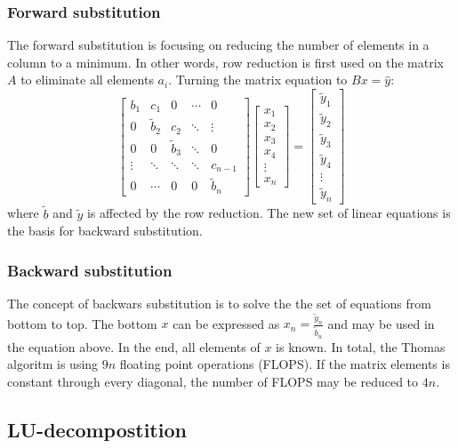 \documentclass[twoside,twocolumn]{article}
\begin{document}
\subsubsection{Forward substitution}
The forward substitution is focusing on reducing the number of elements in a column to a minimum. In other words, row reduction is first used on the matrix $A$ to eliminate all elements $a_{i}$. Turning the matrix equation to $Bx=\hat{y}$:
\begin{equation*}
\begin{bmatrix}
b_1&c_1&0&\cdots &0\\
0&\tilde{b}_2&c_2& \ddots & \vdots\\
0&0&\tilde{b}_3&\ddots&0\\
\vdots&\ddots&\ddots&\ddots&c_{n-1}\\
0&\cdots&0&0&\tilde{b}_n
\end{bmatrix}
\begin{bmatrix}
x_1\\x_2\\x_3\\x_4\\\vdots\\x_{n}
\end{bmatrix}=
\begin{bmatrix}
\tilde{y}_1\\\tilde{y}_2\\\tilde{y}_3\\\tilde{y}_4\\\vdots\\\tilde{y}_{n}
\end{bmatrix} 
\end{equation*}
where $\tilde{b}$ and $\tilde{y}$ is affected by the row reduction. The new set of linear equations is the basis for backward substitution.
\subsubsection{Backward substitution}
The concept of backwars substitution is to solve the the set of equations from bottom to top. The bottom $x$ can be expressed as $x_n=\frac{\tilde{y}_n}{\tilde{b}_n}$ and may be used in the equation above. In the end, all elements of $x$ is known. In total, the Thomas algoritm is using $9n$ floating point operations (FLOPS). If the matrix elements is constant through every diagonal, the number of FLOPS may be reduced to $4n$.

\subsection{LU-decompostition}
\end{document}
